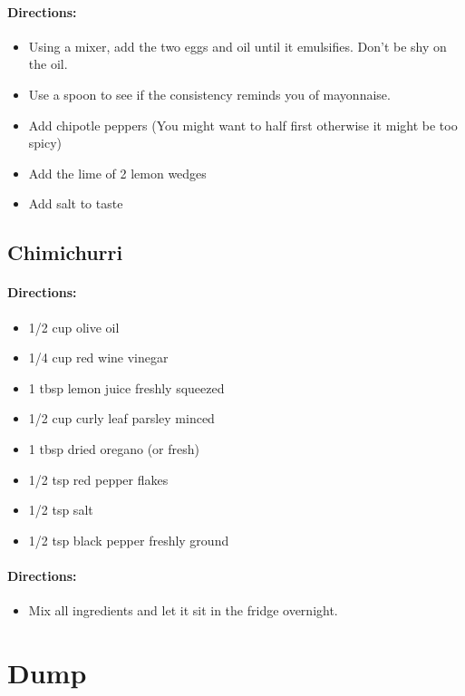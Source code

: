 \documentclass{article}
\begin{document}
\paragraph{Directions:}
\begin{itemize}
	\item Using a mixer, add the two eggs and oil until it emulsifies. Don't be shy on the oil.
	\item Use a spoon to see if the consistency reminds you of mayonnaise.
	\item Add chipotle peppers (You might want to half first otherwise it might be too spicy)
	\item Add the lime of 2 lemon wedges
	\item Add salt to taste
\end{itemize}

\subsection{Chimichurri}

\paragraph{Directions:}
\begin{itemize}
  \item 1/2 cup olive oil
  \item 1/4 cup red wine vinegar
  \item 1 tbsp lemon juice freshly squeezed
  \item 1/2 cup curly leaf parsley minced
  \item 1 tbsp dried oregano (or fresh)
  \item 1/2 tsp red pepper flakes
  \item 1/2 tsp salt
  \item 1/2 tsp black pepper freshly ground	
\end{itemize}

\paragraph{Directions:}
\begin{itemize}
  \item Mix all ingredients and let it sit in the fridge overnight.	
\end{itemize}

\section{Dump}
\end{document}
